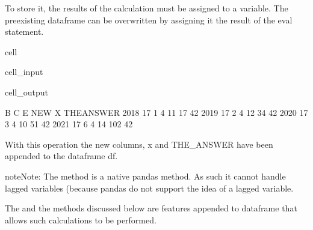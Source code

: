 \documentclass[letterpaper,10pt,english]{jupyterBook}
\begin{document}
\sphinxAtStartPar
To store it, the results of the calculation must be assigned to a variable.  The pre\sphinxhyphen{}existing dataframe can be overwritten by assigning it the result of the eval statement.

\begin{sphinxuseclass}{cell}\begin{sphinxVerbatimInput}

\begin{sphinxuseclass}{cell_input}
\begin{sphinxVerbatim}[commandchars=\\\{\}]
\end{sphinxVerbatim}

\end{sphinxuseclass}\end{sphinxVerbatimInput}
\begin{sphinxVerbatimOutput}

\begin{sphinxuseclass}{cell_output}
\begin{sphinxVerbatim}[commandchars=\\\{\}]
       B  C  E  NEW    X  THE\PYGZus{}ANSWER
2018  17  1  4   11   17          42
2019  17  2  4   12   34          42
2020  17  3  4   10   51          42
2021  17  6  4   14  102          42
\end{sphinxVerbatim}

\end{sphinxuseclass}\end{sphinxVerbatimOutput}

\end{sphinxuseclass}
\sphinxAtStartPar
With this operation the new columns, x and THE\_ANSWER have been appended to the dataframe df.

\begin{sphinxadmonition}{note}{Note:}
\sphinxAtStartPar
The  method is a native pandas method.  As such it cannot handle lagged variables (because pandas do not support the idea of a lagged variable.

\sphinxAtStartPar
The  and the  methods discussed below are  features appended to dataframe that allows such calculations to be performed.
\end{sphinxadmonition}
\end{document}
